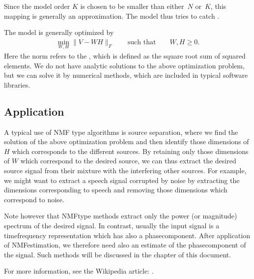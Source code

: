 \documentclass[letterpaper,10pt,english]{jupyterBook}
\begin{document}
\sphinxAtStartPar
Since the model order \(K\) is chosen to be smaller than either \(N\)
or \(K\), this mapping is generally an approximation. The model thus tries
to catch .

\sphinxAtStartPar
The model is generally optimized by
\begin{equation*}
\begin{split} \min_{W,H} \| V - WH \|_F\qquad\text{such that}\qquad
W,H\geq 0. \end{split}
\end{equation*}
\sphinxAtStartPar
Here the norm refers to the , which
is defined as the square root sum of squared elements. We do not have
analytic solutions to the above optimization problem, but we can solve
it by numerical methods, which are included in typical software
libraries.


\subsection{Application}
\label{\detokenize{Modelling/Non-negative_Matrix_and_Tensor_Factorization:application}}
\sphinxAtStartPar
A typical use of NMF type algorithms is source separation, where we find
the solution of the above optimization problem and then identify those
dimensions of \(H\) which corresponds to the different sources. By
retaining only those dimensions of \(W\) which correspond to the desired
source, we can thus extract the desired source signal from their mixture
with the interfering other sources. For example, we might want to
extract a speech signal corrupted by noise by extracting the dimensions
corresponding to speech and removing those dimensions which correspond
to noise.

\sphinxAtStartPar
Note however that NMF\sphinxhyphen{}type methods extract only the power (or magnitude)
spectrum of the desired signal. In contrast, usually the input signal is
a time\sphinxhyphen{}frequency representation which has also a phase\sphinxhyphen{}component. After
application of NMF\sphinxhyphen{}estimation, we therefore need also an estimate of the
phase\sphinxhyphen{}component of the signal. Such methods will be discussed in the
 chapter of this document.

\sphinxAtStartPar
For more information, see the Wikipedia article: .
\end{document}

